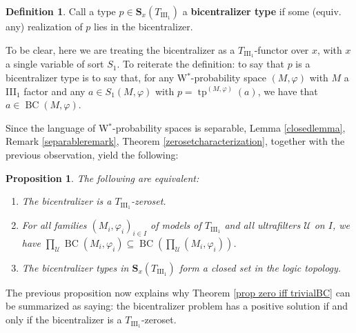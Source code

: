 \documentclass[12pt]{amsart}
\newtheorem{prop}[thm]{Proposition}
\theoremstyle{definition}
\newtheorem{defn}[thm]{Definition}
\def\u{\mathsf 1}
\def \tp{\operatorname{tp}}
\def \u{\mathcal U}
\def\BC{\operatorname{BC}}
\begin{document}
\begin{defn}
Call a type $p\in \mathbf{S}_x(T_{\mathrm{III}_1})$ a \textbf{bicentralizer type} if some (equiv. any) realization of $p$ lies in the bicentralizer.  
\end{defn}

To be clear, here we are treating the bicentralizer as a $T_{\mathrm{III}_1}$-functor over $x$, with $x$ a single variable of sort $S_1$.  To reiterate the definition:  to say that $p$ is a bicentralizer type is to say that, for any W$^*$-probability space $(M,\varphi)$ with $M$ a III$_1$ factor and any $a\in S_1(M,\varphi)$ with $p=\tp^{(M,\varphi)}(a)$, we have that $a\in \BC(M,\varphi)$.

Since the language of W$^*$-probability spaces is separable, Lemma \ref{closedlemma}, Remark \ref{separableremark}, Theorem \ref{zerosetcharacterization}, together with the previous observation, yield the following:

\begin{prop}
The following are equivalent:
\begin{enumerate}
        \item The bicentralizer is a $T_{\mathrm{III}_1}$-zeroset.
    \item For all families $(M_i,\varphi_i)_{i\in I}$ of models of $T_{\mathrm{III}_1}$ and all ultrafilters $\u$ on $I$, we have $\prod_\u \BC(M_i,\varphi_i)\subseteq \BC(\prod_\u (M_i,\varphi_i))$.
    \item The bicentralizer types in $\mathbf{S}_x(T_{\mathrm{III}_1})$ form a closed set in the logic topology.
\end{enumerate}
\end{prop}

The previous proposition now explains why Theorem \ref{prop zero iff trivialBC} can be summarized as saying:  the bicentralizer problem has a positive solution if and only if the bicentralizer is a $T_{\mathrm{III}_1}$-zeroset.





\end{document}

